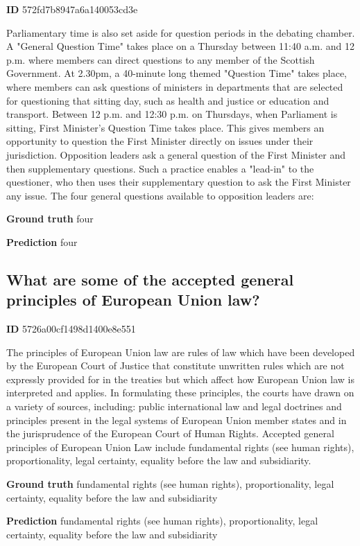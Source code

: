 \documentclass{article} \usepackage{iclr2017_conference,times}
\begin{document}
\textbf{ID} 572fd7b8947a6a140053cd3e

Parliamentary time is also set aside for question periods in the debating chamber. A "General Question Time" takes place on a Thursday between 11:40 a.m. and 12 p.m. where members can direct questions to any member of the Scottish Government. At 2.30pm, a 40-minute long themed "Question Time" takes place, where members can ask questions of ministers in departments that are selected for questioning that sitting day, such as health and justice or education and transport. Between 12 p.m. and 12:30 p.m. on Thursdays, when Parliament is sitting, First Minister's Question Time takes place. This gives members an opportunity to question the First Minister directly on issues under their jurisdiction. Opposition leaders ask a general question of the First Minister and then supplementary questions. Such a practice enables a "lead-in" to the questioner, who then uses their supplementary question to ask the First Minister any issue. The four general questions available to opposition leaders are:

\textbf{Ground truth}
four

\textbf{Prediction}
four



\subsection*{What are some of the accepted general principles of European Union law?}

\textbf{ID} 5726a00cf1498d1400e8e551

The principles of European Union law are rules of law which have been developed by the European Court of Justice that constitute unwritten rules which are not expressly provided for in the treaties but which affect how European Union law is interpreted and applies. In formulating these principles, the courts have drawn on a variety of sources, including: public international law and legal doctrines and principles present in the legal systems of European Union member states and in the jurisprudence of the European Court of Human Rights. Accepted general principles of European Union Law include fundamental rights (see human rights), proportionality, legal certainty, equality before the law and subsidiarity.

\textbf{Ground truth}
fundamental rights (see human rights), proportionality, legal certainty, equality before the law and subsidiarity

\textbf{Prediction}
fundamental rights (see human rights), proportionality, legal certainty, equality before the law and subsidiarity
\end{document}

